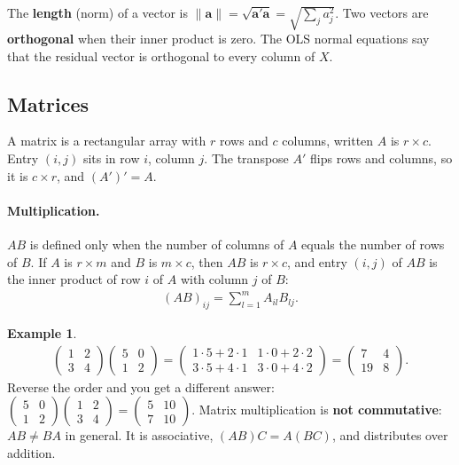 \documentclass[11pt]{article}
\theoremstyle{definition}
\newtheorem{example}{Example}[section]
\begin{document}
The \textbf{length} (norm) of a vector is $\|\bm a\| = \sqrt{\bm a'\bm a} =
\sqrt{\sum_j a_j^2}$. Two vectors are \textbf{orthogonal} when their inner
product is zero. The OLS normal equations say that the residual vector is
orthogonal to every column of $X$.

\subsection{Matrices}

A matrix is a rectangular array with $r$ rows and $c$ columns, written
$A$ is $r \times c$. Entry $(i,j)$ sits in row $i$, column $j$. The
transpose $A'$ flips rows and columns, so it is $c \times r$, and
$(A')' = A$.

\paragraph{Multiplication.} $AB$ is defined only when the number of
columns of $A$ equals the number of rows of $B$. If $A$ is $r \times m$
and $B$ is $m \times c$, then $AB$ is $r \times c$, and entry $(i,j)$ of
$AB$ is the inner product of row $i$ of $A$ with column $j$ of $B$:
\begin{align*}
  (AB)_{ij} = \sum_{l=1}^{m} A_{il}B_{lj} .
\end{align*}

\begin{example}
\begin{align*}
  \begin{pmatrix} 1 & 2 \\ 3 & 4 \end{pmatrix}
  \begin{pmatrix} 5 & 0 \\ 1 & 2 \end{pmatrix}
  =
  \begin{pmatrix} 1\cdot5 + 2\cdot1 & 1\cdot0 + 2\cdot2 \\ 3\cdot5 + 4\cdot1 & 3\cdot0 + 4\cdot2 \end{pmatrix}
  =
  \begin{pmatrix} 7 & 4 \\ 19 & 8 \end{pmatrix}.
\end{align*}
Reverse the order and you get a different answer:
$\begin{pmatrix} 5 & 0 \\ 1 & 2 \end{pmatrix}\begin{pmatrix} 1 & 2 \\ 3 & 4 \end{pmatrix}
= \begin{pmatrix} 5 & 10 \\ 7 & 10 \end{pmatrix}$. Matrix multiplication is
\textbf{not commutative}: $AB \ne BA$ in general. It is associative,
$(AB)C = A(BC)$, and distributes over addition.
\end{example}
\end{document}
